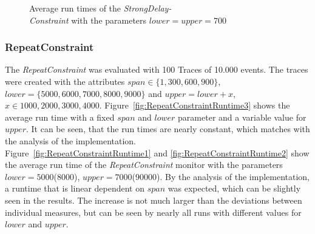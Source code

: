\begin{figure}
\begin{minipage}{0.45\textwidth}
		\centering
		\caption{Average run times of the \textit{StrongDelay-\\Constraint} with the parameters $lower = upper = 700$}
		\label{fig:runtimeStrongDelay2}
	\end{minipage}
\end{figure}




\subsubsection{RepeatConstraint}
	\label{sec_runtimeRepeat}
	The \textit{RepeatConstraint} was evaluated with 100 Traces of 10.000 events. The traces were created with the attributes $span\in\{1,300,600,900\}$, $lower=\{5000,6000,7000,8000,9000\}$ and $upper=lower+x$, $x\in{1000,2000,3000,4000}$.  Figure~\ref{fig:RepeatConstraintRuntime3} shows the average run time with a fixed $span$ and $lower$ parameter and a variable value for $upper$. It can be seen, that the run times are nearly constant, which matches with the analysis of the implementation.\\ Figure~\ref{fig:RepeatConstraintRuntime1} and \ref{fig:RepeatConstraintRuntime2} show the average run time of the \textit{RepeatConstraint} monitor with the parameters $lower=5000$(8000), $upper=7000$(90000). By the analysis of the implementation, a runtime that is linear dependent on $span$ was expected, which can be slightly seen in the results. The increase is not much larger than the deviations between individual measures, but can be seen by nearly all runs with different values for $lower$ and $upper$. 

